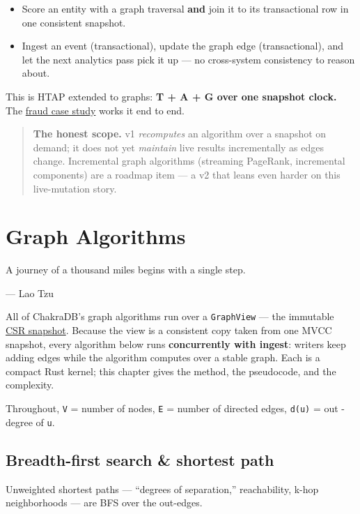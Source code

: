 \documentclass[
  11pt,
  openany]{book}
\providecommand{\tightlist}{%
  \setlength{\itemsep}{0pt}\setlength{\parskip}{0pt}}
\begin{document}
\begin{itemize}
\tightlist
\item
  Score an entity with a graph traversal \textbf{and} join it to its
  transactional row in one consistent snapshot.
\item
  Ingest an event (transactional), update the graph edge
  (transactional), and let the next analytics pass pick it up --- no
  cross-system consistency to reason about.
\end{itemize}

This is HTAP extended to graphs: \textbf{T + A + G over one snapshot
clock.} The \href{../case-studies/fraud.md}{fraud case study} works it
end to end.

\begin{quote}
\textbf{The honest scope.} v1 \emph{recomputes} an algorithm over a
snapshot on demand; it does not yet \emph{maintain} live results
incrementally as edges change. Incremental graph algorithms (streaming
PageRank, incremental components) are a roadmap item --- a v2 that leans
even harder on this live-mutation story.
\end{quote}

\chapter{Graph Algorithms}\label{graph-algorithms}

\epigraph{A journey of a thousand miles begins with a single step.}{--- Lao Tzu}

All of ChakraDB's graph algorithms run over a \texttt{GraphView} --- the
immutable \href{snapshot.md}{CSR snapshot}. Because the view is a
consistent copy taken from one MVCC snapshot, every algorithm below runs
\textbf{concurrently with ingest}: writers keep adding edges while the
algorithm computes over a stable graph. Each is a compact Rust kernel;
this chapter gives the method, the pseudocode, and the complexity.

Throughout, \texttt{V} = number of nodes, \texttt{E} = number of
directed edges, \texttt{d(u)} = out -degree of \texttt{u}.

\section{Breadth-first search \& shortest
path}\label{breadth-first-search-shortest-path}

Unweighted shortest paths --- ``degrees of separation,'' reachability,
k-hop neighborhoods --- are BFS over the out-edges.
\end{document}
